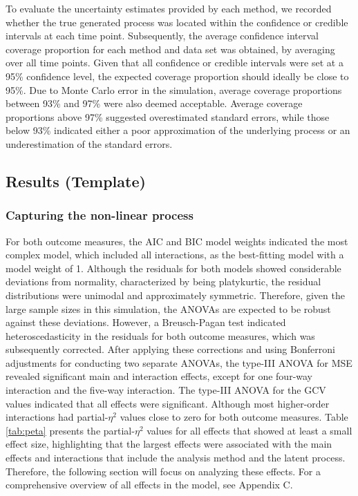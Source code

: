 \documentclass[man, floatsintext]{apa7}
\begin{document}
To evaluate the uncertainty estimates provided by each method, we recorded
whether the true generated process was located within the confidence or
credible intervals at each time point.
Subsequently, the average
confidence interval coverage proportion for each method and data set was
obtained, by averaging over all time points.
Given that all confidence or credible intervals were set at a
95\% confidence level, the expected coverage proportion should ideally be
close to 95\%. Due to Monte Carlo error in the simulation, average coverage
proportions between 93\% and 97\% were also deemed acceptable.
Average coverage proportions above 97\% suggested overestimated standard
errors,
while those below 93\% indicated either a poor approximation of the underlying
process or an underestimation of the standard errors.

\subsection{Results (Template)}

\subsubsection{Capturing the non-linear process}

For both outcome measures, the AIC and BIC model weights indicated the most
complex model, which included all interactions, as the best-fitting model with
a model weight of 1. Although the residuals for both models showed considerable
deviations from normality, characterized by being platykurtic, the residual
distributions were unimodal and approximately symmetric. Therefore, given the
large sample sizes in this simulation, the ANOVAs are expected to be robust
against these deviations. However, a Breusch-Pagan test indicated
heteroscedasticity in the residuals for both outcome measures, which was
subsequently corrected. After applying these corrections and using Bonferroni
adjustments for conducting two separate ANOVAs, the type-III ANOVA for MSE
revealed significant main and interaction effects, except for one four-way
interaction and the five-way interaction. The type-III ANOVA for the GCV values
indicated that all effects were significant. Although most higher-order
interactions had partial-$\eta^2$
values close to zero for both outcome measures.
Table \ref{tab:peta} presents the partial-$\eta^2$
values for all effects that showed at least a small effect size, highlighting
that the largest effects were associated with the main effects and interactions
that include the analysis method and the latent process. Therefore, the
following section will focus on analyzing these effects.
For a comprehensive overview of all effects in the model, see Appendix C.
\end{document}
